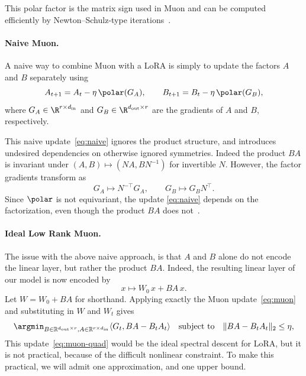 This polar factor is the matrix sign used in Muon and can be computed efficiently by Newton--Schulz-type iterations~\cite{muon,polarexpress}.

\paragraph{Naive Muon.}
A naive way to combine Muon with a LoRA is simply to update the factors $A$ and $B$ separately using  
\begin{equation}
   A_{t+1} = A_t-\eta\,\polar(G_A),\qquad  B_{t+1}= B_t-\eta\,\polar(G_B),
  \label{eq:naive}
\end{equation}
where $G_A \in  \R^{r\times d_{\mathrm{in}}}$ and $G_B
\in\R^{d_{\mathrm{out}}\times r}$ are the gradients of $A$ and $B$, respectively. 


This naive update~\eqref{eq:naive} ignores the product structure, and introduces undesired dependencies on otherwise ignored symmetries. Indeed
the product $BA$ is invariant under $(A,B)\mapsto(NA,BN^{-1})$ for invertible $N$. However, the factor gradients transform as
\[
G_{A} \mapsto N^{-\top}G_{A},
\qquad
G_{B} \mapsto G_{B}N^\top.
\]
Since $\polar$ is not equivariant, the update \eqref{eq:naive} depends on the factorization, even though the product $BA$ does not~\cite{imuon}.


\paragraph{Ideal Low Rank Muon.}
The issue with the above naive approach, is that $A$ and $B$ alone do not encode the linear layer, but rather the product $BA$. 
Indeed, the resulting linear layer of our model is now encoded by
\begin{equation} \label{eq:lin-op}
    x \mapsto W_0 \,x + BA \,x.
\end{equation} 
Let $W = W_0 + BA $ for shorthand.
Applying exactly the Muon update~\eqref{eq:muon} and substituting in $W$ and $W_t$ gives
\begin{equation}\label{eq:muon-quad}
    \argmin_{B \in \mathbb{R}^{d_{\mathrm{out}} \times r},
A \in \mathbb{R}^{r \times d_{\mathrm{in}}}} \langle G_t,BA-B_t A_t\rangle  \quad \mbox{subject to}\quad  \| BA-B_tA_t\|_2 \leq \eta,
\end{equation} 
  This update~\eqref{eq:muon-quad} would be the ideal spectral descent for LoRA, but it is not practical, because of the difficult nonlinear constraint. To make this practical, we will admit one approximation, and one upper bound.

